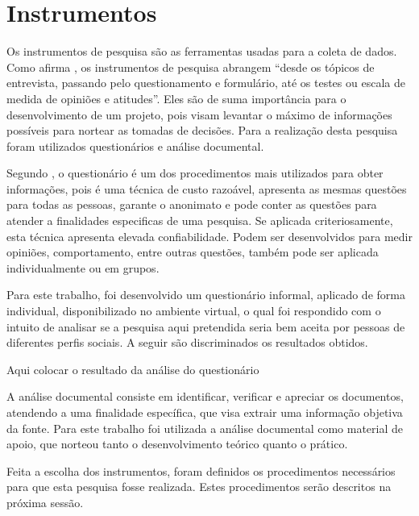\section{Instrumentos}

\par Os instrumentos de pesquisa são as ferramentas usadas para a coleta de dados. Como afirma , os instrumentos de pesquisa abrangem “desde os tópicos de entrevista, passando pelo questionamento e formulário, até os testes ou escala de medida de opiniões e atitudes”. Eles são de suma importância para o desenvolvimento de um projeto, pois visam levantar o máximo de informações possíveis para nortear as tomadas de decisões. Para a realização desta pesquisa foram utilizados questionários e análise documental.

\par Segundo , o questionário é um dos procedimentos mais utilizados para obter informações, pois é uma técnica de custo razoável, apresenta as mesmas questões para todas as pessoas, garante o anonimato e pode conter as questões para atender a finalidades especificas de uma pesquisa. Se aplicada criteriosamente, esta técnica apresenta elevada confiabilidade. Podem ser desenvolvidos para medir opiniões, comportamento, entre outras questões, também pode ser aplicada individualmente ou em grupos.

\par Para este trabalho, foi desenvolvido um questionário informal, aplicado de forma individual, disponibilizado no ambiente virtual, o qual foi respondido com o intuito de analisar se a pesquisa aqui pretendida seria bem aceita por pessoas de diferentes perfis sociais. A seguir são discriminados os resultados obtidos.

Aqui colocar o resultado da análise do questionário

\par A análise documental consiste em identificar, verificar e apreciar os documentos, atendendo a uma finalidade específica, que visa extrair uma informação objetiva da fonte. Para este trabalho foi utilizada a análise documental como material de apoio, que norteou tanto o desenvolvimento teórico quanto o prático.

\par Feita a escolha dos instrumentos, foram definidos os procedimentos necessários para que esta pesquisa fosse realizada. Estes procedimentos serão descritos na próxima sessão.


